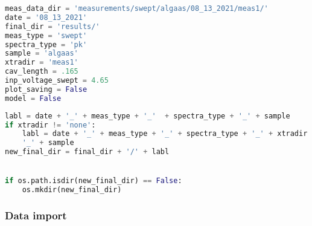 \begin{lstlisting}[frame=single, language=Python]
meas_data_dir = 'measurements/swept/algaas/08_13_2021/meas1/'                                # directory where the uncalibrated data lives
date = '08_13_2021'                                                              # date when measurement was taken ("mm_dd_yyyy")
final_dir = 'results/'                                                           # directory where the final data will live
meas_type = 'swept'                                                              # type of measurement taken tag (i.e. noise, swept)
spectra_type = 'pk'                                                              # spectra type (i.e. pk, rms)
sample = 'algaas'                                                                # sample tag (i.e. algaas, atfilms, sio2tao5, etc.)
xtradir = 'meas1'                                                                # this label helps distinguish between measurements taken in a given day
cav_length = .165                                                                # recorded length of cavity
inp_voltage_swept = 4.65                                                         # voltage sent from SR785 to HVA connected to electrodes
plot_saving = False                                                              # generate and save .png files for intermediate calibration functions
model = False                                                                    # boolean that decides whether or not the model estimate should be plotted with calibrated data
\end{lstlisting}

\begin{lstlisting}[frame=single, language=Python]
labl = date + '_' + meas_type + '_'  + spectra_type + '_' + sample               # label of the directory containing all the figures and .h5 file
if xtradir != 'none':                                                            # adjusted label if an extra directory was used
    labl = date + '_' + meas_type + '_' + spectra_type + '_' + xtradir +  \
    '_' + sample
new_final_dir = final_dir + '/' + labl


if os.path.isdir(new_final_dir) == False:                                        # generates the directory containing the results if it doesn't already exist
    os.mkdir(new_final_dir)
\end{lstlisting}

\subsubsection{Data import}\label{data-import}

